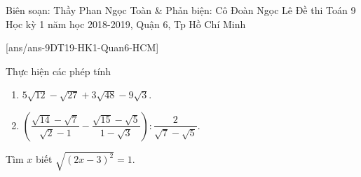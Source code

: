 \begin{name}
{Biên soạn: Thầy Phan Ngọc Toàn \& Phản biện: Cô Đoàn Ngọc Lê}
{Đề thi Toán 9 Học kỳ 1 năm học 2018-2019, Quận 6, Tp Hồ Chí Minh }
\end{name}
\setcounter{bt}{0}
[ans/ans-9DT19-HK1-Quan6-HCM]
\begin{bt}%
	Thực hiện các phép tính
	\begin{enumerate}
\item $5\sqrt{12}-\sqrt{27}+3\sqrt{48}-9\sqrt{3}$.
\item $\left(\dfrac{\sqrt{14}-\sqrt{7}}{\sqrt{2}-1}- \dfrac{\sqrt{15}-\sqrt{5}}{1-\sqrt{3}} \right): \dfrac{2}{\sqrt{7}-\sqrt{5}}$.
\end{enumerate}
\end{bt}
\begin{bt}%
	Tìm $x$ biết $\sqrt{(2x-3)^2}=1$.
\end{bt}

